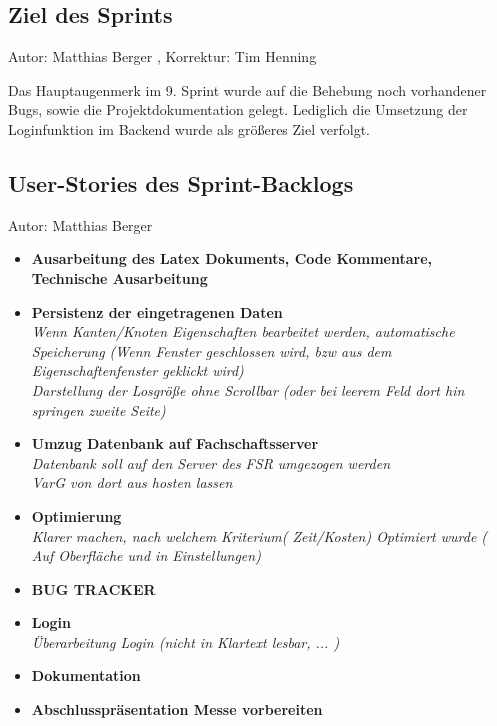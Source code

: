 
\subsection{Ziel des Sprints}
{\small Autor: Matthias Berger , Korrektur: Tim Henning}

Das Hauptaugenmerk im 9. Sprint wurde auf die Behebung noch vorhandener Bugs, sowie die Projektdokumentation gelegt. Lediglich die Umsetzung der Loginfunktion im Backend wurde als größeres Ziel verfolgt.

\subsection{User-Stories des Sprint-Backlogs}
{\small Autor: Matthias Berger}

\begin{itemize}
\item \textbf{Ausarbeitung des Latex Dokuments, Code Kommentare, Technische Ausarbeitung}

\item \textbf{Persistenz der eingetragenen Daten }
      \\\textit{Wenn Kanten/Knoten Eigenschaften bearbeitet werden, automatische Speicherung (Wenn Fenster geschlossen wird, bzw aus dem Eigenschaftenfenster geklickt wird)
      \\Darstellung der Losgröße ohne Scrollbar (oder bei leerem Feld dort hin springen zweite Seite)}

\item \textbf{Umzug Datenbank auf Fachschaftsserver}
      \\\textit{Datenbank soll auf den Server des FSR umgezogen werden
      \\VarG von dort aus hosten lassen}
       
\item \textbf{Optimierung}
      \\\textit{Klarer machen, nach welchem Kriterium( Zeit/Kosten) Optimiert wurde ( Auf Oberfläche und in Einstellungen)}
      
\item \textbf{BUG TRACKER}

\item \textbf{Login}
      \\\textit{Überarbeitung Login (nicht in Klartext lesbar, ... )}
      
\item \textbf{Dokumentation}

\item \textbf{Abschlusspräsentation Messe vorbereiten }
\end{itemize}

